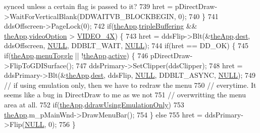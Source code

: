 \begin{DoxyCode}
{{{{       synced unless a certain flag is passed to it?}
739       hret = pDirectDraw->WaitForVerticalBlank(DDWAITVB\_BLOCKBEGIN, 0);
740     \}
741     ddsOffscreen->PageLock(0);
742     \textcolor{keywordflow}{if}(\mbox{\hyperlink{_v_b_a_8cpp_a8095a9d06b37a7efe3723f3218ad8fb3}{theApp}}.\mbox{\hyperlink{class_v_b_a_af597e2c2466efdc6365a5d725651b855}{tripleBuffering}} && \mbox{\hyperlink{_v_b_a_8cpp_a8095a9d06b37a7efe3723f3218ad8fb3}{theApp}}.\mbox{\hyperlink{class_v_b_a_a17dac073149c897f770c00ed7098ad32}{videoOption}} > 
      \mbox{\hyperlink{_v_b_a_8h_a531c35e38ede3ea4e5ba5afb24b29493a6468bce6b84e6350d3de126f257eb38d}{VIDEO\_4X}}) \{
743       hret = ddsFlip->Blt(&\mbox{\hyperlink{_v_b_a_8cpp_a8095a9d06b37a7efe3723f3218ad8fb3}{theApp}}.\mbox{\hyperlink{class_v_b_a_aed77fc82f818810cc87c470768c75e05}{dest}}, ddsOffscreen, \mbox{\hyperlink{getopt1_8c_a070d2ce7b6bb7e5c05602aa8c308d0c4}{NULL}}, DDBLT\_WAIT, 
      \mbox{\hyperlink{getopt1_8c_a070d2ce7b6bb7e5c05602aa8c308d0c4}{NULL}});
744       \textcolor{keywordflow}{if}(hret == DD\_OK) \{
745         \textcolor{keywordflow}{if}(\mbox{\hyperlink{_v_b_a_8cpp_a8095a9d06b37a7efe3723f3218ad8fb3}{theApp}}.\mbox{\hyperlink{class_v_b_a_a0bacc38e144832326c5d4d6df6ababa3}{menuToggle}} || !\mbox{\hyperlink{_v_b_a_8cpp_a8095a9d06b37a7efe3723f3218ad8fb3}{theApp}}.\mbox{\hyperlink{class_v_b_a_ad3d55365d59a78eb24711c594eeb3b2b}{active}}) \{
746           pDirectDraw->FlipToGDISurface();
747           ddsPrimary->SetClipper(ddsClipper);
748           hret = ddsPrimary->Blt(&\mbox{\hyperlink{_v_b_a_8cpp_a8095a9d06b37a7efe3723f3218ad8fb3}{theApp}}.\mbox{\hyperlink{class_v_b_a_aed77fc82f818810cc87c470768c75e05}{dest}}, ddsFlip, \mbox{\hyperlink{getopt1_8c_a070d2ce7b6bb7e5c05602aa8c308d0c4}{NULL}}, DDBLT\_ASYNC, 
      \mbox{\hyperlink{getopt1_8c_a070d2ce7b6bb7e5c05602aa8c308d0c4}{NULL}});
749           \textcolor{comment}{// if using emulation only, then we have to redraw the menu}
750           \textcolor{comment}{// everytime. It seems like a bug in DirectDraw to me as we not}
751           \textcolor{comment}{// overwritting the menu area at all.}
752           \textcolor{keywordflow}{if}(\mbox{\hyperlink{_v_b_a_8cpp_a8095a9d06b37a7efe3723f3218ad8fb3}{theApp}}.\mbox{\hyperlink{class_v_b_a_a88c703304afd9e17cd80cf3e3a825f7f}{ddrawUsingEmulationOnly}})
753             \mbox{\hyperlink{_v_b_a_8cpp_a8095a9d06b37a7efe3723f3218ad8fb3}{theApp}}.m\_pMainWnd->DrawMenuBar();
754         \} \textcolor{keywordflow}{else}
755           hret = ddsPrimary->Flip(\mbox{\hyperlink{getopt1_8c_a070d2ce7b6bb7e5c05602aa8c308d0c4}{NULL}}, 0);
756       \}
}}}
\end{DoxyCode}
